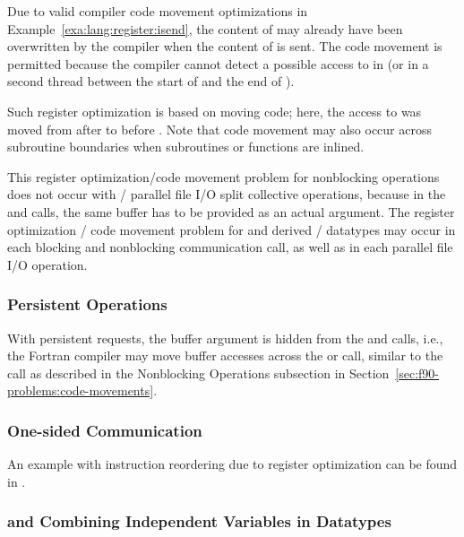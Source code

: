 Due to valid compiler code movement optimizations in Example~\ref{exa:lang:register:isend},
the content of  may already have been overwritten by the compiler
when the content of  is sent.
The code movement is permitted because the compiler cannot detect a possible access
to  in  (or in a second thread between
the start of  and the end of ).

Such register optimization is based on moving code; here, the access to 
was moved from after  to before .
Note that code movement may also occur across subroutine boundaries when
subroutines or functions are inlined.

This register optimization/code movement problem for nonblocking operations does not occur
with \MPI/ parallel file I/O split collective operations,
because in the  and  calls,
the same buffer has to be provided as an actual argument.
The register optimization / code movement problem for 
and derived \MPI/ datatypes may occur in each blocking and nonblocking
communication call, as well as in each parallel file I/O operation.

\subsubsection{Persistent Operations}

With persistent requests, the buffer argument is hidden from the
 and  calls, i.e., the
Fortran compiler may move buffer accesses across the
 or  call, similar to the
 call as described in the Nonblocking Operations
subsection in Section~\ref{sec:f90-problems:code-movements}.

\subsubsection{One-sided Communication}

An example with instruction reordering due to register optimization can be found
in .

\subsubsection{\texorpdfstring{}{MPI\_BOTTOM} and Combining Independent Variables in Datatypes}

